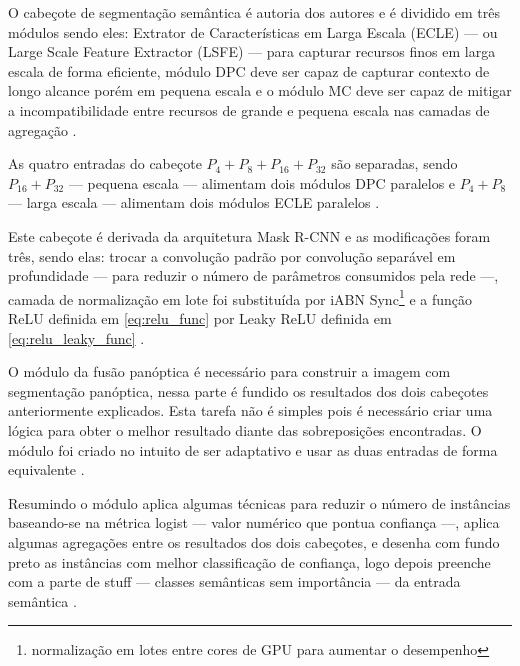 
O cabeçote de segmentação semântica é autoria dos autores e é dividido em três módulos sendo eles: Extrator de Características em Larga Escala (ECLE) — ou Large Scale Feature Extractor (LSFE) — para capturar recursos finos em larga escala de forma eficiente, módulo DPC deve ser capaz de capturar contexto de longo alcance porém em pequena escala e o módulo MC deve ser capaz de mitigar a incompatibilidade entre recursos de grande e pequena escala nas camadas de agregação \cite{mohan2020efficientps}.

As quatro entradas do cabeçote $ P_4 + P_8 + P_{16} + P_{32} $ são separadas, sendo $ P_{16} + P_{32} $ — pequena escala — alimentam dois módulos DPC paralelos e $ P_4 + P_8 $ — larga escala — alimentam dois módulos ECLE paralelos \cite{mohan2020efficientps}.


Este cabeçote é derivada da arquitetura Mask R-CNN e as modificações foram três, sendo elas: trocar a convolução padrão por convolução separável em profundidade — para reduzir o número de parâmetros consumidos pela rede —, camada de normalização em lote foi substituída por iABN Sync\footnote{normalização em lotes entre cores de GPU para aumentar o desempenho} e a função ReLU definida em \cref{eq:relu_func} por Leaky ReLU definida em \cref{eq:relu_leaky_func} \cite{mohan2020efficientps,redes-neurais-convolucionais-separaveis-em-profundidade, serp-ai}.


O módulo da fusão panóptica é necessário para construir a imagem com segmentação panóptica, nessa parte é fundido os resultados dos dois cabeçotes anteriormente explicados. Esta tarefa não é simples pois é necessário criar uma lógica para obter o melhor resultado diante das sobreposições encontradas. O módulo foi criado no intuito de ser adaptativo e usar as duas entradas de forma equivalente \cite{mohan2020efficientps}.

Resumindo o módulo aplica algumas técnicas para reduzir o número de instâncias baseando-se na métrica logist — valor numérico que pontua confiança —, aplica algumas agregações entre os resultados dos dois cabeçotes, e desenha com fundo preto as instâncias com melhor classificação de confiança, logo depois preenche com a parte de stuff — classes semânticas sem importância — da entrada semântica \cite{mohan2020efficientps}.